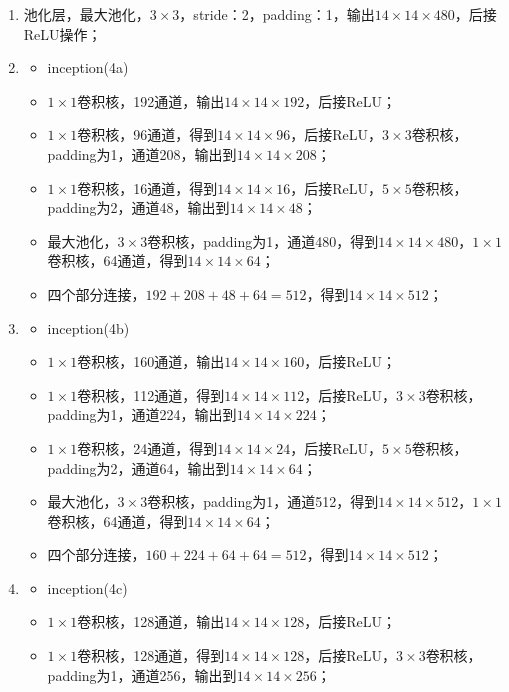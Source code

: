 \begin{enumerate}
\begin{itemize}
	      \end{itemize}
	\item 池化层，最大池化，$3\times3$，stride：2，padding：1，输出$14\times14\times480$，后接ReLU操作；
	\item
	      \begin{itemize}
		      \item inception(4a)
		      \item $1\times1$卷积核，192通道，输出$14\times14\times192$，后接ReLU；
		      \item $1\times1$卷积核，96通道，得到$14\times14\times96$，后接ReLU，$3\times3$卷积核，padding为1，通道208，输出到$14\times14\times208$；
		      \item $1\times1$卷积核，16通道，得到$14\times14\times16$，后接ReLU，$5\times5$卷积核，padding为2，通道48，输出到$14\times14\times48$；
		      \item 最大池化，$3\times3$卷积核，padding为1，通道480，得到$14\times14\times480$，$1\times1$卷积核，64通道，得到$14\times14\times64$；
		      \item 四个部分连接，$192+208+48+64=512$，得到$14\times14\times512$；
	      \end{itemize}
	\item
	      \begin{itemize}
		      \item inception(4b)
		      \item $1\times1$卷积核，160通道，输出$14\times14\times160$，后接ReLU；
		      \item $1\times1$卷积核，112通道，得到$14\times14\times112$，后接ReLU，$3\times3$卷积核，padding为1，通道224，输出到$14\times14\times224$；
		      \item $1\times1$卷积核，24通道，得到$14\times14\times24$，后接ReLU，$5\times5$卷积核，padding为2，通道64，输出到$14\times14\times64$；
		      \item 最大池化，$3\times3$卷积核，padding为1，通道512，得到$14\times14\times512$，$1\times1$卷积核，64通道，得到$14\times14\times64$；
		      \item 四个部分连接，$160+224+64+64=512$，得到$14\times14\times512$；
	      \end{itemize}
	\item
	      \begin{itemize}
		      \item inception(4c)
		      \item $1\times1$卷积核，128通道，输出$14\times14\times128$，后接ReLU；
		      \item $1\times1$卷积核，128通道，得到$14\times14\times128$，后接ReLU，$3\times3$卷积核，padding为1，通道256，输出到$14\times14\times256$；

\end{itemize}
\end{enumerate}
